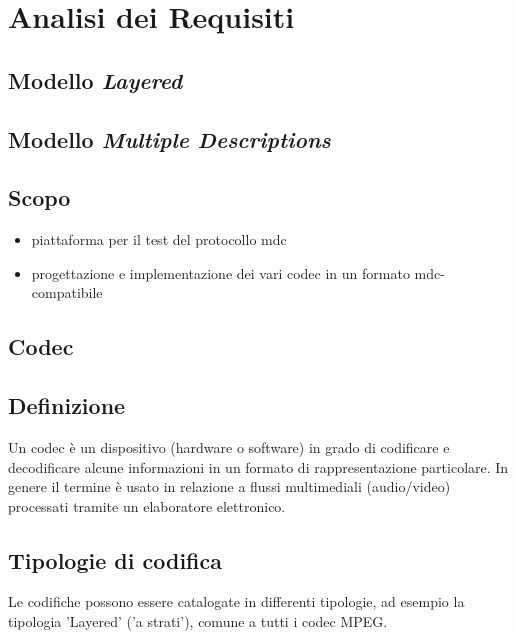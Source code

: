 \chapter{Analisi dei Requisiti}

\section{Modello \emph{Layered}}

\section{Modello \emph{Multiple Descriptions}}

\section{Scopo}


\begin{itemize}
\item piattaforma per il test del protocollo mdc

\item progettazione e implementazione dei vari codec in un formato mdc-compatibile
\end{itemize}




\section{Codec}



\section{Definizione}


Un codec è un dispositivo (hardware o software) in grado di codificare e decodificare alcune informazioni in un formato di rappresentazione particolare. In genere il termine è usato in relazione a flussi multimediali (audio/video) processati tramite un elaboratore elettronico.






\section{Tipologie di codifica}


Le codifiche possono essere catalogate in differenti tipologie, ad esempio la tipologia 'Layered' ('a strati'), comune a tutti i codec MPEG.



